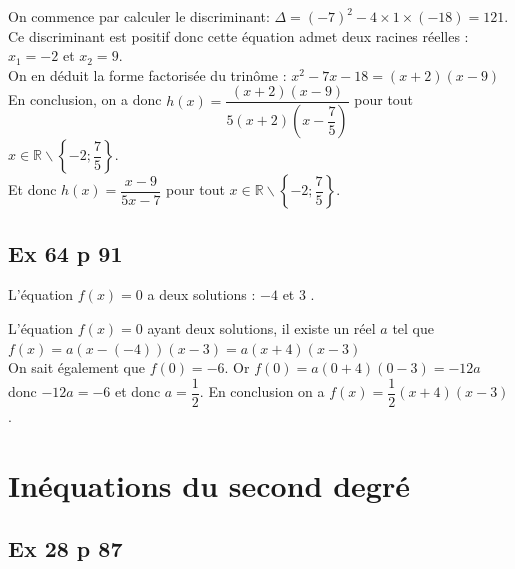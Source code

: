 \documentclass[12pt,a4paper]{book}
\begin{document}
\begin{enumMet}
	On commence par calculer le discriminant: $\Delta=(-7)^2-4 \times 1 \times(-18)=121$.\\
	Ce discriminant est positif donc cette équation admet deux racines réelles : $x_1=-2$ et $x_2=9$.\\
	On en déduit la forme factorisée du trinôme : $x^2-7 x-18=(x+2)(x-9)$\\
	En conclusion, on a donc $h(x)=\dfrac{(x+2)(x-9)}{5(x+2)\left(x-\dfrac{7}{5}\right)}$ pour tout $x \in \mathbb{R} \backslash\left\{-2 ; \dfrac{7}{5}\right\}$.\\
	Et donc $h(x)=\dfrac{x-9}{5 x-7}$ pour tout $x \in \mathbb{R} \backslash\left\{-2 ; \dfrac{7}{5}\right\}$.
\end{enumMet}	


\subsection*{Ex 64 p 91}

\begin{enumMet}
    \item L'équation $f(x)=0$ a deux solutions : $-4$ et 3 .
    \item L'équation $f(x)=0$ ayant deux solutions, il existe un réel $a$ tel que $f(x)=a(x-(-4))(x-3)=a(x+4)(x-3)$\\
    On sait également que $f(0)=-6 .$ Or $f(0)=a(0+4)(0-3)=-12 a$ donc $-12 a=-6$ et donc $a=\dfrac{1}{2}$. En conclusion on a $f(x)=\dfrac{1}{2}(x+4)(x-3)$.
\end{enumMet}

\section*{Inéquations du second degré}

\subsection*{Ex 28 p 87}
\end{document}
